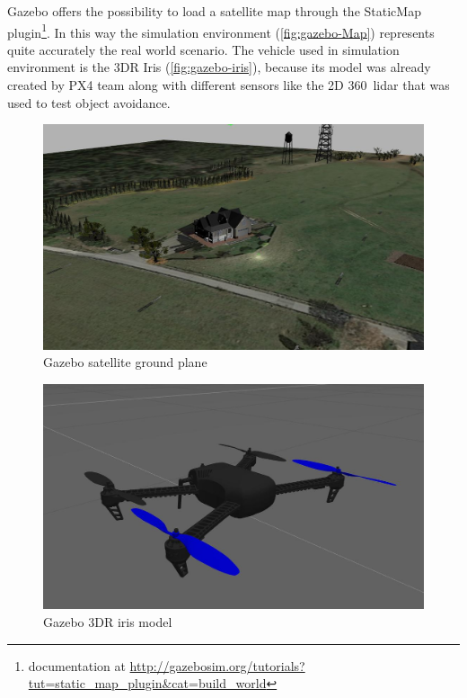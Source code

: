 Gazebo offers the possibility to load a satellite map through the \textsf{StaticMap} plugin\footnote{documentation at \url{http://gazebosim.org/tutorials?tut=static_map_plugin&cat=build_world}}. In this way the simulation environment (\autoref{fig:gazebo-Map}) represents  quite accurately the real world scenario.
The vehicle used in simulation environment is the 3DR Iris (\autoref{fig:gazebo-iris}), because its model was already created by PX4 team along with different sensors like the 2D 360\degree\ lidar that was used to test object avoidance.
\begin{figure}[ht]
  \centering
  \includegraphics[width=.7\linewidth]{figures/C4/simulation/gazebo-bambi-world.jpg}
  \caption{Gazebo satellite ground plane}
  \label{fig:gazebo-Map}
\end{figure}
\begin{figure}[ht]
  \centering
  \includegraphics[width=.5\linewidth]{figures/C4/simulation/iris-model1.jpg}
  \caption{Gazebo 3DR iris model}
  \label{fig:gazebo-iris}
\end{figure}


